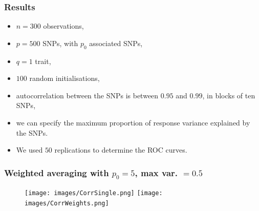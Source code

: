 \documentclass{beamer}
\begin{document}
\begin{frame}
\frametitle{Results}
\begin{itemize}
\item $n = 300$ observations,
\item $p = 500$ SNPs, with $p_0$ associated SNPs,
\item $q = 1$ trait, %
\item $100$ random initialisations,
\item autocorrelation between the SNPs is between $0.95$ and $0.99$, in blocks of ten SNPs,
\item we can specify the maximum proportion of response variance explained by the SNPs.
\item We used $50$ replications to determine the ROC curves.
\end{itemize}
\end{frame}



\begin{frame}
\frametitle{Weighted averaging with $p_0 = 5$, max var. $=0.5$}
\begin{figure}
\texttt{[image: images/CorrSingle.png]}
\texttt{[image: images/CorrWeights.png]}
\end{figure}
\end{frame}
\end{document}
